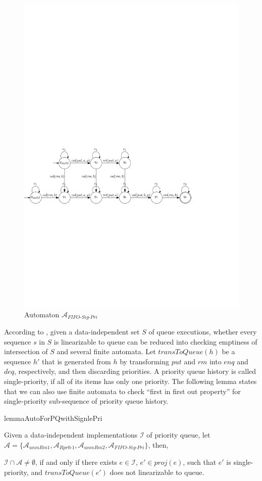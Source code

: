 \documentclass{llncs}
\begin{document}
\begin{figure}[htbp]
  \centering
  \includegraphics[width=0.8 \textwidth]{PIC_AUTO_QUEUE_FOR_SINGLE_PRI.pdf}
  \caption{Automaton $\mathcal{A}_{\textit{FIFO-Sig-Pri}}$}
  \label{fig:automata for FIFO of single priority}
\end{figure}

According to \cite{Bouajjani:2015}, given a data-independent set $S$ of queue executions, whether every sequence $s$ in $S$ is linearizable to queue can be reduced into checking emptiness of intersection of $S$ and several finite automata. Let $\textit{transToQueue}(h)$ be a sequence $h'$ that is generated from $h$ by transforming $\textit{put}$ and $\textit{rm}$ into $\textit{enq}$ and $\textit{deq}$, respectively, and then discarding priorities. A priority queue history is called single-priority, if all of its items has only one priority. The following lemma states that we can also use finite automata to check ``first in first out property'' for single-priority sub-sequence of priority queue history.

\begin{restatable}{lemma}{AutoForPQwithSignlePri}
\label{lemma:automata for priority queue with single priority}

Given a data-independent implementations $\mathcal{I}$ of priority queue, let $\mathcal{A} = \{ \mathcal{A}_{\textit{unmRm1}}, \mathcal{A}_{\textit{Rpr0-1}}, \mathcal{A}_{\textit{unmRm2}}, \mathcal{A}_{\textit{FIFO-Sig-Pri}} \}$, then,

$\mathcal{I} \cap \mathcal{A} \neq \emptyset$, if and only if there exists $e \in \mathcal{I}$, $e' \in \textit{proj}(e)$, such that $e'$ is single-priority, and $\textit{transToQueue}(e')$ does not linearizable to queue.
\end{restatable}
\end{document}
